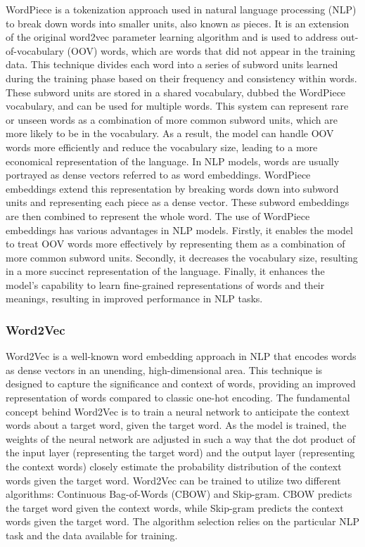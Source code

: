 WordPiece\cite{DBLP:journals/corr/WuSCLNMKCGMKSJL16} is a tokenization approach used in natural language processing (NLP) to break down words into smaller units, also known as pieces. It is an extension of the original word2vec parameter learning algorithm and is used to address out-of-vocabulary (OOV) words, which are words that did not appear in the training data.
This technique divides each word into a series of subword units learned during the training phase based on their frequency and consistency within words. These subword units are stored in a shared vocabulary, dubbed the WordPiece vocabulary, and can be used for multiple words.
This system can represent rare or unseen words as a combination of more common subword units, which are more likely to be in the vocabulary. As a result, the model can handle OOV words more efficiently and reduce the vocabulary size, leading to a more economical representation of the language.
In NLP models, words are usually portrayed as dense vectors referred to as word embeddings. WordPiece embeddings extend this representation by breaking words down into subword units and representing each piece as a dense vector. These subword embeddings are then combined to represent the whole word.
The use of WordPiece embeddings has various advantages in NLP models. Firstly, it enables the model to treat OOV words more effectively by representing them as a combination of more common subword units. Secondly, it decreases the vocabulary size, resulting in a more succinct representation of the language. Finally, it enhances the model's capability to learn fine-grained representations of words and their meanings, resulting in improved performance in NLP tasks.

\subsubsection{Word2Vec}

Word2Vec\cite{DBLP:journals/corr/Rong14} is a well-known word embedding approach in NLP that encodes words as dense vectors in an unending, high-dimensional area. This technique is designed to capture the significance and context of words, providing an improved representation of words compared to classic one-hot encoding.
The fundamental concept behind Word2Vec is to train a neural network to anticipate the context words about a target word, given the target word. As the model is trained, the weights of the neural network are adjusted in such a way that the dot product of the input layer (representing the target word) and the output layer (representing the context words) closely estimate the probability distribution of the context words given the target word.
Word2Vec can be trained to utilize two different algorithms: Continuous Bag-of-Words (CBOW) and Skip-gram. CBOW predicts the target word given the context words, while Skip-gram predicts the context words given the target word. The algorithm selection relies on the particular NLP task and the data available for training.

